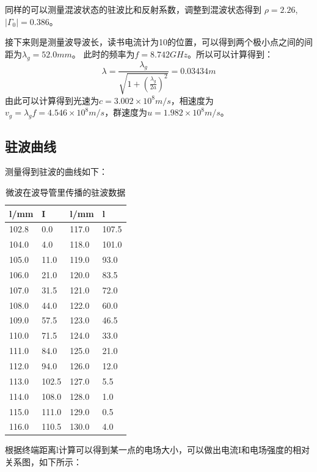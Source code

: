 \documentclass[aps,pre,12pt,preprint,onecolumn,showpacs,showkeys,UTF8]{revtex4-1}
\begin{document}
同样的可以测量混波状态的驻波比和反射系数，调整到混波状态得到 $\rho = 2.26$, $|\Gamma_0|=0.386$。

接下来则是测量波导波长，读书电流计为10的位置，可以得到两个极小点之间的间距为$\lambda_g=52.0mm$。 此时的频率为$f=8.742GHz$。所以可以计算得到：
\begin{equation}
	\lambda=\frac{\lambda_g}{\sqrt{1+(\frac{\lambda_g}{2a})^2}}=0.03434m
\end{equation}
由此可以计算得到光速为$c=3.002\times10^8m/s$，相速度为$v_g=\lambda_g f = 4.546\times 10^8m/s$，群速度为$u = 1.982 \times 10^8 m/s$。

\subsection{驻波曲线}

测量得到驻波的曲线如下：
\begin{table}[ht]
	\centering
	\begin{tabular}{m{3cm}<{\centering}m{3cm}<{\centering}m{3cm}<{\centering}m{3cm}<{\centering}}
		\hline
		\hline
l/mm	&	I	&	l/mm	&	l	\\
\hline
102.8	&	0.0	&	117.0	&	107.5	\\
104.0	&	4.0	&	118.0	&	101.0	\\
105.0	&	11.0	&	119.0	&	93.0	\\
106.0	&	21.0	&	120.0	&	83.5	\\
107.0	&	31.5	&	121.0	&	72.0	\\
108.0	&	44.0	&	122.0	&	60.0	\\
109.0	&	57.5	&	123.0	&	46.5	\\
110.0	&	71.5	&	124.0	&	33.0	\\
111.0	&	84.0	&	125.0	&	21.0	\\
112.0	&	94.0	&	126.0	&	12.0	\\
113.0	&	102.5	&	127.0	&	5.5	\\
114.0	&	108.0	&	128.0	&	1.0	\\
115.0	&	111.0	&	129.0	&	0.5	\\
116.0	&	110.5	&	130.0	&	4.0	\\
\hline
	\end{tabular}
	\caption{微波在波导管里传播的驻波数据}
	\label{tab:table1}
\end{table}

根据终端距离l计算可以得到某一点的电场大小，可以做出电流I和电场强度的相对关系图，如下所示：
\end{document}
